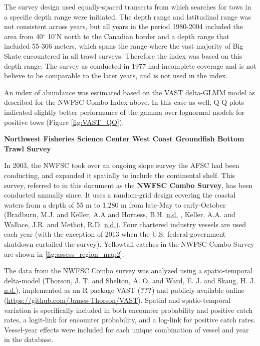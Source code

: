 \documentclass[12pt,]{article}
\begin{document}
The survey design used equally-spaced transects from which searches for
tows in a specific depth range were initiated. The depth range and
latitudinal range was not consistent across years, but all years in the
period 1980-2004 included the area from 40\(^\circ\) 10'N north to the
Canadian border and a depth range that included 55-366 meters, which
spans the range where the vast majority of Big Skate encountered in all
trawl surveys. Therefore the index was based on this depth range. The
survey as conducted in 1977 had incomplete coverage and is not believe
to be comparable to the later years, and is not used in the index.

An index of abundance was estimated based on the VAST delta-GLMM model
as described for the NWFSC Combo Index above. In this case as well, Q-Q
plots indicated slightly better performance of the gamma over lognormal
models for positive tows (Figure \ref{fig:VAST_QQ}).

\textbf{Northwest Fisheries Science Center West Coast Groundfish Bottom
Trawl Survey}

In 2003, the NWFSC took over an ongoing slope survey the AFSC had been
conducting, and expanded it spatially to include the continental shelf.
This survey, referred to in this document as the \textbf{NWFSC Combo
Survey}, has been conducted annually since. It uses a random-grid design
covering the coastal waters from a depth of 55 m to 1,280 m from
late-May to early-October (Bradburn, M.J. and Keller, A.A and Horness,
B.H. \protect\hyperlink{ref-Bradburn2011}{n.d.} , Keller, A.A. and
Wallace, J.R. and Methot, R.D.
\protect\hyperlink{ref-Keller2017}{n.d.}). Four chartered industry
vessels are used each year (with the exception of 2013 when the U.S.
federal-government shutdown curtailed the survey). Yellowtail catches in
the NWFSC Combo Survey are shown in \ref{fig:assess_region_map2}.

The data from the NWFSC Combo survey was analyzed using a
spatio-temporal delta-model (Thorson, J. T. and Shelton, A. O. and Ward,
E. J. and Skaug, H. J. \protect\hyperlink{ref-Thorson2015}{n.d.}),
implemented as an R package VAST ({\textbf{???}}) and publicly available
online (\url{https://github.com/James-Thorson/VAST}). Spatial and
spatio-temporal variation is specifically included in both encounter
probability and positive catch rates, a logit-link for encounter
probability, and a log-link for positive catch rates. Vessel-year
effects were included for each unique combination of vessel and year in
the database.
\end{document}
